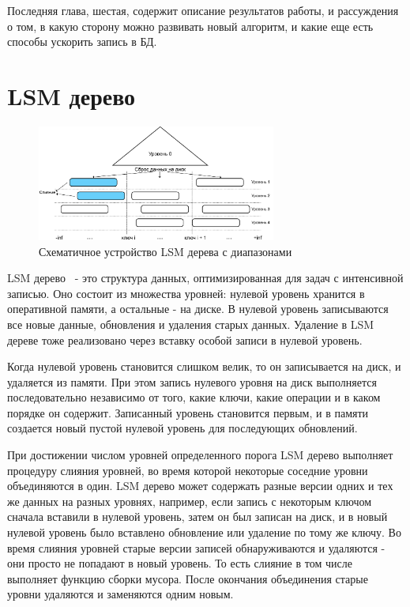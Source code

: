 \documentclass[a4paper,hidelinks,12pt]{article}
\begin{document}
Последняя глава, шестая, содержит описание результатов работы, и рассуждения о
том, в какую сторону можно развивать новый алгоритм, и какие еще есть способы
ускорить запись в БД.

\section{LSM дерево}

\begin{figure}[h]
\centering
\includegraphics[width=0.7\textwidth]{compaction_schema}
\caption{Схематичное устройство LSM дерева с диапазонами}
\label{fig:compaction_schema}
\end{figure}

LSM дерево~\cite{lsm-intro} - это структура данных, оптимизированная для задач с
интенсивной записью. Оно состоит из множества уровней: нулевой уровень хранится
в оперативной памяти, а остальные - на диске. В нулевой уровень записываются все
новые данные, обновления и удаления старых данных. Удаление в LSM дереве тоже
реализовано через вставку особой записи в нулевой уровень.

Когда нулевой уровень становится слишком велик, то он записывается на диск, и
удаляется из памяти. При этом запись нулевого уровня на диск выполняется
последовательно независимо от того, какие ключи, какие операции и в каком
порядке он содержит. Записанный уровень становится первым, и в памяти создается
новый пустой нулевой уровень для последующих обновлений.

При достижении числом уровней определенного порога LSM дерево выполняет
процедуру слияния уровней, во время которой некоторые соседние уровни
объединяются в один. LSM дерево может содержать разные версии одних и тех же
данных на разных уровнях, например, если запись с некоторым ключом сначала
вставили в нулевой уровень, затем он был записан на диск, и в новый нулевой
уровень было вставлено обновление или удаление по тому же ключу. Во время
слияния уровней старые версии записей обнаруживаются и удаляются - они просто не
попадают в новый уровень. То есть слияние в том числе выполняет функцию сборки
мусора. После окончания объединения старые уровни удаляются и заменяются одним
новым.
\end{document}
